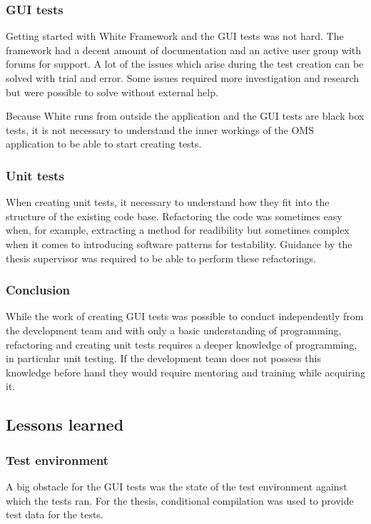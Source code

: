 \documentclass{article}
\begin{document}
			\subsubsection{GUI tests}
			Getting started with White Framework and the GUI tests was not hard. The framework had a decent amount of documentation and an active user group with forums for support. A lot of the issues which arise during the test creation can be solved with trial and error. Some issues required more investigation and research but were possible to solve without external help. 

			Because White runs from outside the application and the GUI tests are black box tests, it is not necessary to understand the inner workings of the OMS application to be able to start creating tests.

			\subsubsection{Unit tests}
			When creating unit tests, it necessary to understand how they fit into the structure of the existing code base. Refactoring the code was sometimes easy when, for example, extracting a method for readibility but sometimes complex when it comes to introducing software patterns for testability. Guidance by the thesis supervisor was required to be able to perform these refactorings.

			\subsubsection{Conclusion}
			While the work of creating GUI tests was possible to conduct independently from the development team and with only a basic understanding of programming, refactoring and creating unit tests requires a deeper knowledge of programming, in particular unit testing. If the development team does not possess this knowledge before hand they would require mentoring and training while acquiring it.

		\subsection{Lessons learned}
			\subsubsection{Test environment}
			A big obstacle for the GUI tests was the state of the test environment against which the tests ran. For the thesis, conditional compilation was used to provide test data for the tests. 
\end{document}
